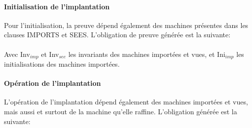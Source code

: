 \paragraph{Initialisation de l'implantation} Pour l'initialisation, la preuve
dépend également des machines présentes dans les clauses IMPORTS et
SEES. L'obligation de preuve générée est la suivante:\\

 \\

Avec Inv$_{imp}$ et  Inv$_{see}$ les invariants des machines importées et vues,
et Ini$_{imp}$ les initialisations des machines importées. \\


\paragraph{Opération de l'implantation}
L'opération de l'implantation dépend également des machines importées et vues, mais
aussi et surtout de la machine qu'elle raffine. L'obligation générée est la
suivante:\\

\\





